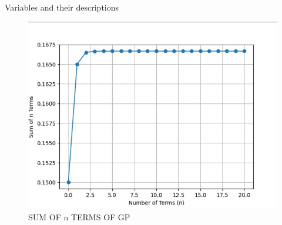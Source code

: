 \documentclass[journal,12pt,twocolumn]{IEEEtran}
\theoremstyle{remark}
\begin{document}
 \begin{flushleft}
     \begin{table}[h]
         \caption{Variables and their descriptions}
         \label{tab:table2}
         
     \end{table}
 \end{flushleft}
\newpage

\begin{figure}[h]
  \centering
  \includegraphics[width=1.0\textwidth]{figs/graph.png}
  \caption{SUM OF n TERMS OF GP}
  \label{fig:your_label}
\end{figure}
\end{document}

